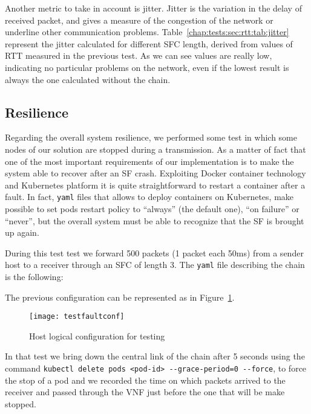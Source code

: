 Another metric to take in account is jitter. Jitter is the variation in the
delay of received packet, and gives a measure of the congestion of the network
or underline other communication problems.
Table~\ref{chap:tests:sec:rtt:tab:jitter} represent the jitter calculated for
different SFC length, derived from values of RTT measured in the previous test.
As we can see values are really low, indicating no particular problems on the
network, even if the lowest result is always the one calculated without the
chain.

\subsection{Resilience}
Regarding the overall system resilience, we performed some test in which some
nodes of our solution are stopped during a transmission. As a matter of fact
that one of the most important requirements of our implementation is to make
the system  able to recover after an SF crash. Exploiting Docker container
technology and Kubernetes platform it is quite straightforward to restart a
container after a fault. In fact, \texttt{yaml} files that allows to deploy
containers on Kubernetes, make possible to set pods restart policy to
``always'' (the default one), ``on failure'' or ``never'', but the overall
system must be able to recognize that the SF is brought up again. 

During this test test we forward 500 packets (1 packet each 50ms) from a sender
host to a receiver through an SFC of length 3. The \texttt{yaml} file
describing the chain is the following:



The previous configuration can be represented as in
Figure~\ref{chap:tests:sec:fault:img:testfaultconf}.
\begin{figure}[H]
  \centering
  \texttt{[image: testfaultconf]}
  \caption{Host logical configuration for testing}
  \label{chap:tests:sec:fault:img:testfaultconf}
\end{figure}

In that test we bring down the central link of the chain after 5 seconds using
the command \verb!kubectl delete pods <pod-id> --grace-period=0 --force!, to
force the stop of a pod and we recorded the time on which packets arrived to
the receiver and passed through the VNF just before the one that will be make
stopped.

